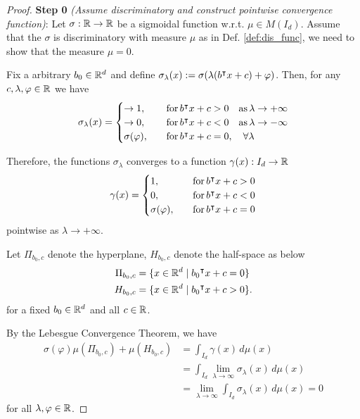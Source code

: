 \begin{proof}

    \textbf{Step 0} \textit{(Assume discriminatory and construct pointwise
    convergence function)}: Let $\sigma: \mathbb{R} \to \mathbb{R}$ be a sigmoidal function
    w.r.t. $\mu \in M(I_d)$. Assume that the $\sigma$ is discriminatory with
    measure $\mu$ as in Def. \ref{def:dis_func}, we need to show that the measure
    $\mu = 0$.

    Fix a arbitrary $b_0 \in \mathbb{R}^d$ and define $\sigma_{\lambda}(x) :=
    \sigma(\lambda (b{}^{\intercal} x + c) + \varphi)$. Then, for any $c, \lambda, \varphi
    \in \mathbb{R}$ we have
    \begin{equation}
        \sigma_{\lambda}(x)
        = \begin{cases}
            \to 1, \quad &\operatorname{for} b{}^{\intercal} x + c > 0 \quad \text{as}\, \lambda \to +\infty \\
            \to 0, \quad &\operatorname{for} b{}^{\intercal} x + c < 0 \quad \text{as}\, \lambda \to -\infty \\
            \sigma(\varphi), \quad &\operatorname{for} b{}^{\intercal} x + c = 0, \quad\forall \lambda
        \end{cases}
    \end{equation}

    Therefore, the functions $\sigma_{\lambda}$ converges to a function
    $\gamma(x): I_d \to \mathbb{R}$
    \begin{equation}
        \gamma(x) = 
        \begin{cases}
            1,               \quad &\operatorname{for} b{}^{\intercal} x + c > 0 \\
            0,               \quad &\operatorname{for} b{}^{\intercal} x + c < 0 \\
            \sigma(\varphi), \quad &\operatorname{for} b{}^{\intercal} x + c = 0
        \end{cases}
    \end{equation}
    pointwise as $\lambda \to + \infty$.
    
    Let $\Pi_{b_0,c}$ denote the hyperplane, $H_{b_0, c}$ denote the
    half-space as below 
    \begin{align}
        \Pi_{b_0,c} &= \{x\in\mathbb{R}^d \mid b_0{}^{\intercal} x + c = 0\} \\
        H_{b_0, c}  &= \{x\in\mathbb{R}^d \mid b_0{}^{\intercal} x + c > 0\}.
    \end{align}
    for a fixed $b_0 \in \mathbb{R}^d$ and all $c \in \mathbb{R}$.
    
    By the Lebesgue Convergence Theorem, we have
    \begin{align*}
        \sigma(\varphi) \mu(\Pi_{b_0, c}) + \mu (H_{b_0, c})
        &= \int_{I_d} \gamma(x) \,d\mu(x) \\
        &= \int_{I_d} \lim_{\lambda\to\infty} \sigma_{\lambda}(x)\,d\mu(x) \\
        &= \lim_{\lambda\to\infty} \int_{I_d} \sigma_{\lambda}(x)\,d\mu(x) = 0
    \end{align*}
    for all $\lambda, \varphi \in \mathbb{R}$.


\end{proof}
